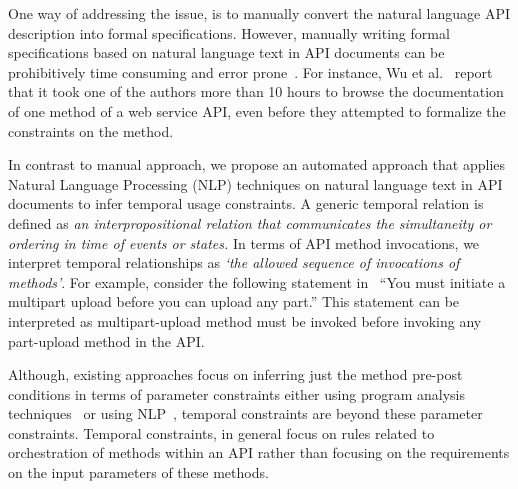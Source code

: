 One way of addressing the issue, is to manually convert the natural language API description into formal specifications. 
However, manually writing formal specifications based on natural language text in API documents can be prohibitively time consuming and error prone~\cite{wu2013inferring,RubingerWEB10}. 
For instance, Wu et al.~\cite{wu2013inferring} report that it took one of the authors more than 10 hours to browse the documentation of one method of a web service API, even before they attempted to formalize the constraints on the method.

In contrast to manual approach, we propose an automated approach that applies Natural Language Processing (NLP) techniques on natural language text in API documents to infer temporal usage constraints. 
A generic temporal relation is defined as \textit{an interpropositional relation that communicates the simultaneity or ordering in time of events or states.}
In terms of API method invocations, we interpret temporal relationships as \textit{`the allowed sequence of invocations of methods'}.
For example, consider the following statement in \amazonAPI\ ``You must initiate a multipart upload before you can upload any part.''
This statement can be interpreted as multipart-upload method must be invoked before invoking any part-upload method in the API.




Although, existing approaches focus on inferring just the method pre-post conditions in terms of parameter constraints either using program analysis techniques~\cite{Henkel07discoveringdocumentation,Ghezzi:2009:SIB:1555001.1555057,Henkel:2008:DDA:1363102.1363105,Flanagan:2001:HAA:647540.730008,Buse:2008:ADI:1390630.1390664} or using NLP~\cite{pandita12:inferring, wu2013inferring}, temporal constraints are beyond these parameter constraints.
Temporal constraints, in general focus on rules related to orchestration of methods within an API rather than focusing on the requirements on the input parameters of these methods.

